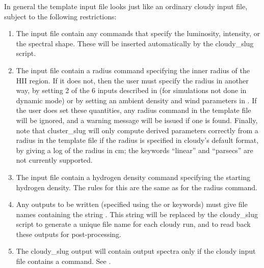 \documentclass[letterpaper,10pt,english]{sphinxmanual}
\begin{document}
In general the template input file looks just like an ordinary cloudy
input file, subject to the following restrictions:
\begin{enumerate}
\item {} 
The input file  contain any commands that specify the
luminosity, intensity, or the spectral shape. These will be
inserted automatically by the cloudy\_slug script.

\item {} 
The input file  contain a radius command specifying the inner
radius of the HII region. If it does not, then the user must
specify the radius in another way, by setting 2 of the 6 inputs
described in {\hyperref[\detokenize{cloudy:sssec-cloudy-nebular-properties}]{}} (for
simulations not done in dynamic mode) or by setting an ambient
density and wind parameters in
{\hyperref[\detokenize{cloudy:sssec-cloudy-dynamical-cluster-mode}]{}}. If the user does
set these quantities, any radius command in the template file will be
ignored, and a warning message will be issued if one is
found. Finally, note that cluster\_slug will only compute derived
parameters correctly from a radius in the template file if the
radius is specified in cloudy’s default format, by giving a log of
the radius in cm; the keywords “linear” and “parsecs” are not
currently supported.

\item {} 
The input file  contain a hydrogen density command specifying
the starting hydrogen density. The rules for this are the same as
for the radius command.

\item {} 
Any outputs to be written (specified using the  or
 keywords) must give file names containing the string
. This string will be replaced by the
cloudy\_slug script to generate a unique file name for each cloudy
run, and to read back these outputs for post-processing.

\item {} 
The cloudy\_slug output will contain output spectra only if the
cloudy input file contains a  command. See
{\hyperref[\detokenize{cloudy:ssec-cloudy-output}]{}}.


\end{enumerate}
\end{document}
